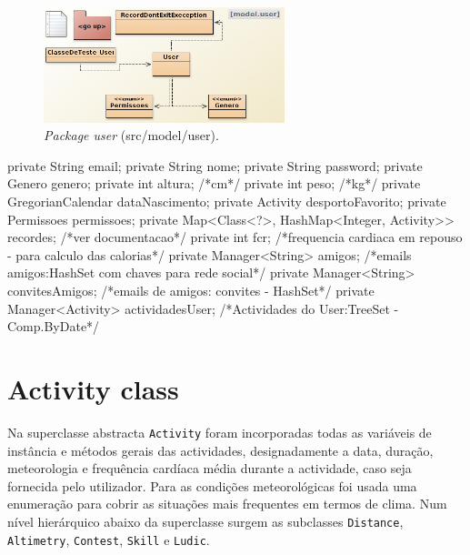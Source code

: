 \documentclass[a4paper,10pt]{report}
\begin{document}
\begin{figure}
\centering
\includegraphics[width=7cm]{user.png}
\caption{\emph{Package user}  (src/model/user).}
\label{fig:user}
\end{figure}

\begin{code}[caption=Variáveis de instância da classe User (src/model/user)., label=code:user]
private String email;
private String nome;
private String password;
private Genero genero;
private int altura; /*cm*/
private int peso; /*kg*/
private GregorianCalendar dataNascimento;
private Activity desportoFavorito;
private Permissoes permissoes;
private Map<Class<?>, HashMap<Integer, Activity>>  recordes; /*ver documentacao*/
private int fcr; /*frequencia cardiaca em repouso - para calculo das calorias*/
private Manager<String> amigos; /*emails amigos:HashSet com chaves para rede social*/
private Manager<String> convitesAmigos; /*emails de amigos: convites - HashSet*/
private Manager<Activity> actividadesUser; /*Actividades do User:TreeSet -Comp.ByDate*/
\end{code}

\section{Activity class}
\label{sec:activity}
Na superclasse abstracta \verb!Activity! foram incorporadas todas as variáveis de instância e métodos gerais das actividades, 
designadamente a data, duração, meteorologia e frequência cardíaca média durante a actividade, caso seja fornecida pelo utilizador.
Para as condições meteorológicas foi usada uma enumeração para cobrir as situações mais frequentes em termos de clima.
Num nível hierárquico abaixo da superclasse surgem as subclasses \verb!Distance!, \verb!Altimetry!, \verb!Contest!, \verb!Skill! e \verb!Ludic!.
\end{document}
